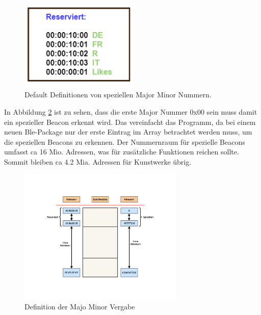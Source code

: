 \begin{figure}[htbp!!!!]
	\centering
	\includegraphics[width=0.5\textwidth]{Data/Reserviert_picture.png}
	\caption[Software:Definierte MM]{Default Definitionen von speziellen Major Minor Nummern.}
	\label{fig:Bluetooth_def_MM}
\end{figure}

In Abbildung \ref{fig:Bluetooth_MM_Vergabe} ist zu sehen, dass die erste Major Nummer 0x00 sein muss damit ein spezieller Beacon erkennt wird. Das vereinfacht das Programm, da bei einem neuen Ble-Package nur der erste Eintrag im Array betrachtet werden muss, um die speziellen Beacons zu erkennen. Der Nummernraum für spezielle Beacons umfasst ca 16 Mio. Adressen, was für zusätzliche Funktionen reichen sollte. Sommit bleiben ca 4.2 Mia. Adressen für Kunstwerke übrig.


\begin{figure}[htbp!!!!]
	\centering
	\includegraphics[width=0.7\textwidth]{Data/Speicheradressen_picture.png}
	\caption[Software:MM Vergabe]{Definition der Majo Minor Vergabe}
	\label{fig:Bluetooth_MM_Vergabe}
\end{figure}



